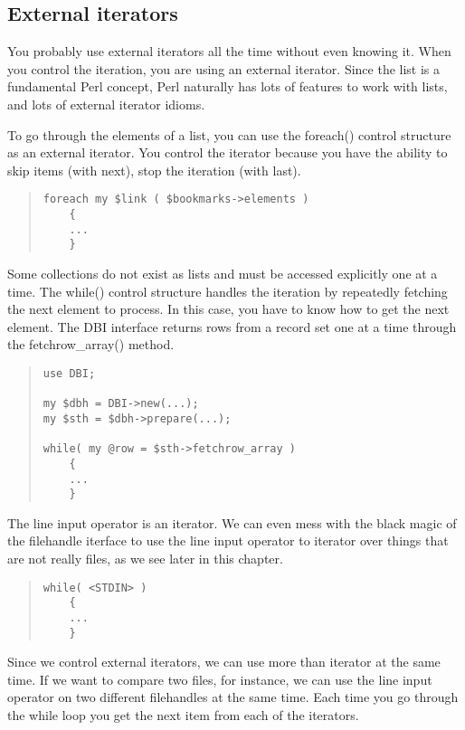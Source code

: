     \subsection{External iterators}

You probably use external iterators all the time without even
knowing it.  When you control the iteration, you are using an
external iterator.  Since the list is a fundamental Perl
concept, Perl naturally has lots of features to work with
lists, and lots of external iterator idioms.

To go through the elements of a list, you can use the foreach()
control structure as an external iterator.  You control the
iterator because you have the ability to skip items (with next),
stop the iteration (with last).

\begin{quote}
\begin{verbatim}
foreach my $link ( $bookmarks->elements )
    {
    ...
    }
\end{verbatim}
\end{quote}
    
Some collections do not exist as lists and must be accessed
explicitly one at a time.  The while() control structure handles
the iteration by repeatedly fetching the next element to process.
In this case, you have to know how to get the next element.  The
DBI interface returns rows from a record set one at a time through
the fetchrow_array() method.

\begin{quote}
\begin{verbatim}
use DBI;

my $dbh = DBI->new(...);
my $sth = $dbh->prepare(...);

while( my @row = $sth->fetchrow_array )
    {
    ...
    }
\end{verbatim}
\end{quote}
    
The line input operator is an iterator. 
We can even mess with the black magic of the filehandle
iterface to use the line input operator to iterator over things that
are not really files, as we see later in this chapter.
    
\begin{quote}
\begin{verbatim}
while( <STDIN> )
    {
    ...
    }
\end{verbatim}
\end{quote}

Since we control external iterators, we can use more than iterator at
the same time.  If we want to compare two files, for instance,
we can use the line input operator on two different filehandles
at the same time.  Each time you go through the while loop you
get the next item from each of the iterators.

